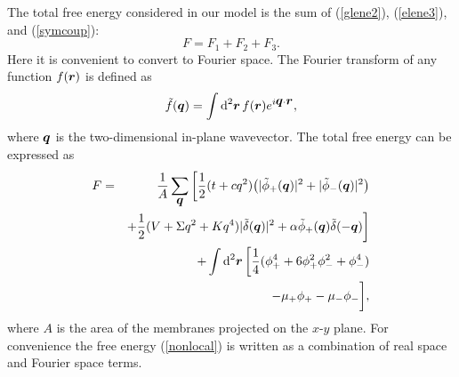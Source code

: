 The total free energy considered in our model is the sum of
(\ref{glene2}), (\ref{elene3}), and (\ref{symcoup}):
\begin{equation}
F = F_1 + F_2 + F_3.
\label{symtotal}
\end{equation}
%
Here it is convenient to convert to Fourier space. The Fourier
transform of any function $f(\mbox{\boldmath $r$})$ is defined as
%
\begin{equation}
\tilde{f}(\mbox{\boldmath $q$}) = \int \mbox{d}^2
\mbox{\boldmath $r$} \, f(\mbox{\boldmath $r$}) e^{i
\mbox{\boldmath $q$} \cdot \mbox{\boldmath $r$}},
\end{equation}
where $\mbox{\boldmath $q$}$ is the two-dimensional in-plane
wavevector. The total free energy can be expressed as
\begin{eqnarray}
F & = & \frac{1}{A}\sum_{\mbox{\boldmath $q$}} \, \biggl[
\frac{1}{2} (t +c q^2) \big( \vert \tilde{\phi}_+(\mbox{\boldmath
$q$}) \vert^2 + \vert \tilde{\phi}_-(\mbox{\boldmath $q$})
\vert^2 \big) \nonumber  \\ & & +  \frac{1}{2} (V + \Sigma q^2 + K
q^4) \vert \tilde{\delta}(\mbox{\boldmath $q$}) \vert^2 + \alpha
\tilde{\phi}_+(\mbox{\boldmath $q$})
\tilde{\delta}(-\mbox{\boldmath $q$}) \biggr] \nonumber  \\ & & +
\int \mbox{d}^2 \mbox{\boldmath $r$} \, \biggr[ \frac{1}{4}
(\phi_+^4 + 6 \phi_+^2 \phi_-^2 + \phi_-^4) \nonumber  \\ & &
-\mu_+ \phi_+ -\mu_- \phi_- \biggr], \label{nonlocal}
\end{eqnarray}
where $A$ is the area of the membranes projected on the $x$-$y$ plane.
For convenience the free energy (\ref{nonlocal}) is written as
a combination of real space and Fourier space terms.


